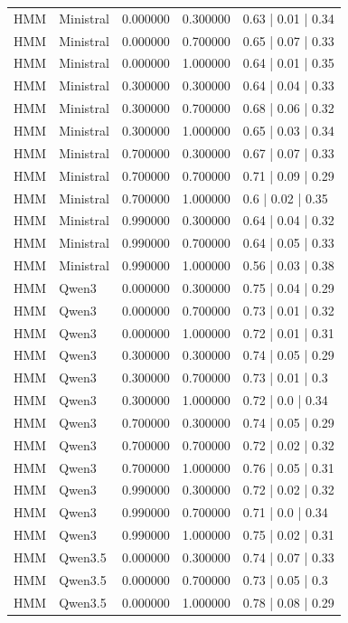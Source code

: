 \begin{longtable}{lllll}
HMM & Ministral & 0.000000 & 0.300000 & 0.63 | 0.01 | 0.34 \\
HMM & Ministral & 0.000000 & 0.700000 & 0.65 | 0.07 | 0.33 \\
HMM & Ministral & 0.000000 & 1.000000 & 0.64 | 0.01 | 0.35 \\
HMM & Ministral & 0.300000 & 0.300000 & 0.64 | 0.04 | 0.33 \\
HMM & Ministral & 0.300000 & 0.700000 & 0.68 | 0.06 | 0.32 \\
HMM & Ministral & 0.300000 & 1.000000 & 0.65 | 0.03 | 0.34 \\
HMM & Ministral & 0.700000 & 0.300000 & 0.67 | 0.07 | 0.33 \\
HMM & Ministral & 0.700000 & 0.700000 & 0.71 | 0.09 | 0.29 \\
HMM & Ministral & 0.700000 & 1.000000 & 0.6 | 0.02 | 0.35 \\
HMM & Ministral & 0.990000 & 0.300000 & 0.64 | 0.04 | 0.32 \\
HMM & Ministral & 0.990000 & 0.700000 & 0.64 | 0.05 | 0.33 \\
HMM & Ministral & 0.990000 & 1.000000 & 0.56 | 0.03 | 0.38 \\
HMM & Qwen3 & 0.000000 & 0.300000 & 0.75 | 0.04 | 0.29 \\
HMM & Qwen3 & 0.000000 & 0.700000 & 0.73 | 0.01 | 0.32 \\
HMM & Qwen3 & 0.000000 & 1.000000 & 0.72 | 0.01 | 0.31 \\
HMM & Qwen3 & 0.300000 & 0.300000 & 0.74 | 0.05 | 0.29 \\
HMM & Qwen3 & 0.300000 & 0.700000 & 0.73 | 0.01 | 0.3 \\
HMM & Qwen3 & 0.300000 & 1.000000 & 0.72 | 0.0 | 0.34 \\
HMM & Qwen3 & 0.700000 & 0.300000 & 0.74 | 0.05 | 0.29 \\
HMM & Qwen3 & 0.700000 & 0.700000 & 0.72 | 0.02 | 0.32 \\
HMM & Qwen3 & 0.700000 & 1.000000 & 0.76 | 0.05 | 0.31 \\
HMM & Qwen3 & 0.990000 & 0.300000 & 0.72 | 0.02 | 0.32 \\
HMM & Qwen3 & 0.990000 & 0.700000 & 0.71 | 0.0 | 0.34 \\
HMM & Qwen3 & 0.990000 & 1.000000 & 0.75 | 0.02 | 0.31 \\
HMM & Qwen3.5 & 0.000000 & 0.300000 & 0.74 | 0.07 | 0.33 \\
HMM & Qwen3.5 & 0.000000 & 0.700000 & 0.73 | 0.05 | 0.3 \\
HMM & Qwen3.5 & 0.000000 & 1.000000 & 0.78 | 0.08 | 0.29 \\

\end{longtable}

